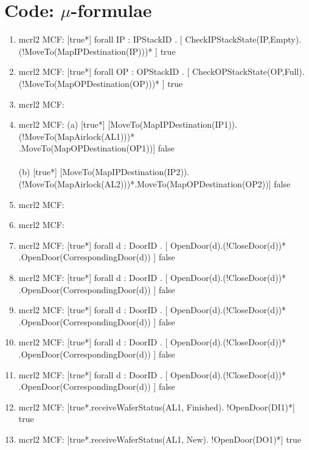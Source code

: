 \documentclass[a4paper,12pt]{article}
\begin{document}
\section{Code: $\mu$-formulae}
\begin{enumerate}

\item mcrl2 MCF: [true*] forall IP : IPStackID . [ CheckIPStackState(IP,Empty).
\\(!MoveTo(MapIPDestination(IP)))* ] true

\item mcrl2 MCF: [true*] forall OP : OPStackID . [ CheckOPStackState(OP,Full).
\\(!MoveTo(MapOPDestination(OP)))* ] true

\item mcrl2 MCF:

\item mcrl2 MCF: (a) [true*] [MoveTo(MapIPDestination(IP1)). (!MoveTo(MapAirlock(AL1)))*
\\.MoveTo(MapOPDestination(OP1))] false
\\
\\ (b) [true*] [MoveTo(MapIPDestination(IP2)). (!MoveTo(MapAirlock(AL2)))*.MoveTo(MapOPDestination(OP2))] false


\item mcrl2 MCF:

\item mcrl2 MCF:

\item mcrl2 MCF: [true*] forall d : DoorID . [ OpenDoor(d).(!CloseDoor(d))*
\\.OpenDoor(CorrespondingDoor(d)) ] false

\item mcrl2 MCF: [true*] forall d : DoorID . [ OpenDoor(d).(!CloseDoor(d))*
\\.OpenDoor(CorrespondingDoor(d)) ] false

\item mcrl2 MCF: [true*] forall d : DoorID . [ OpenDoor(d).(!CloseDoor(d))*
\\.OpenDoor(CorrespondingDoor(d)) ] false

\item mcrl2 MCF: [true*] forall d : DoorID . [ OpenDoor(d).(!CloseDoor(d))*
\\.OpenDoor(CorrespondingDoor(d)) ] false

\item mcrl2 MCF: [true*] forall d : DoorID . [ OpenDoor(d).(!CloseDoor(d))*
\\.OpenDoor(CorrespondingDoor(d)) ] false

\item mcrl2 MCF: [true*.receiveWaferStatus(AL1, Finished). !OpenDoor(DI1)*] true


\item mcrl2 MCF: [true*.receiveWaferStatus(AL1, New). !OpenDoor(DO1)*] true


\end{enumerate}
\end{document}

